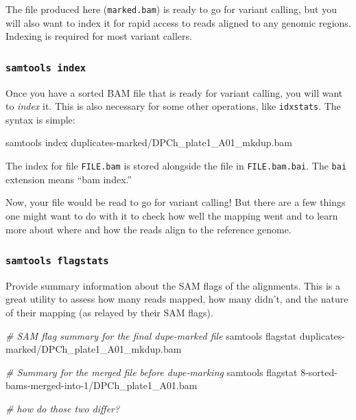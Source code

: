 \documentclass[]{krantz}
\makeatletter
\newenvironment{Shaded}{\begin{snugshade}}{\end{snugshade}}
\newcommand{\CommentTok}[1]{\textcolor[rgb]{0.37,0.37,0.37}{\textit{#1}}}
\newcommand{\ExtensionTok}[1]{#1}
\newcommand{\NormalTok}[1]{#1}
\newenvironment{kframe}{%
\medskip{}
\setlength{\fboxsep}{.8em}
 \def\at@end@of@kframe{}%
 \ifinner\ifhmode%
  \def\at@end@of@kframe{\end{minipage}}%
  \begin{minipage}{\columnwidth}%
 \fi\fi%
 \def\FrameCommand##1{\hskip\@totalleftmargin \hskip-\fboxsep
 \colorbox{shadecolor}{##1}\hskip-\fboxsep
     \hskip-\linewidth \hskip-\@totalleftmargin \hskip\columnwidth}%
 \MakeFramed {\advance\hsize-\width
   \@totalleftmargin\z@ \linewidth\hsize
   \@setminipage}}%
 {\par\unskip\endMakeFramed%
 \at@end@of@kframe}
\renewenvironment{Shaded}{\begin{kframe}}{\end{kframe}}
\makeatother
\begin{document}
The file produced here (\texttt{marked.bam}) is ready to go for variant calling, but
you will also want to index it for rapid access to reads aligned to any genomic
regions. Indexing is required for most variant callers.

\hypertarget{samtools-index}{%
\subsubsection{\texorpdfstring{\texttt{samtools\ index}}{samtools index}}\label{samtools-index}}

Once you have a sorted BAM file that is ready for variant calling, you will want
to \emph{index} it. This is also necessary for some other operations, like \texttt{idxstats}.
The syntax is simple:

\begin{Shaded}
\begin{Highlighting}[]
\ExtensionTok{samtools}\NormalTok{ index duplicates-marked/DPCh_plate1_A01_mkdup.bam}
\end{Highlighting}
\end{Shaded}

The index for file \texttt{FILE.bam} is stored alongside the file in
\texttt{FILE.bam.bai}. The \texttt{bai} extension means ``bam index.''

Now, your file would be read to go for variant calling!
But there are a few things one might want to do with it to check how well
the mapping went and to learn more about where and how the reads align
to the reference genome.

\hypertarget{samtools-flagstats}{%
\subsubsection{\texorpdfstring{\texttt{samtools\ flagstats}}{samtools flagstats}}\label{samtools-flagstats}}

Provide summary information about the SAM flags of the alignments.
This is a great utility to assess how many reads mapped, how many didn't,
and the nature of their mapping (as relayed by their SAM flags).

\begin{Shaded}
\begin{Highlighting}[]
\CommentTok{# SAM flag summary for the final dupe-marked file}
\ExtensionTok{samtools}\NormalTok{ flagstat duplicates-marked/DPCh_plate1_A01_mkdup.bam}

\CommentTok{# Summary for the merged file before dupe-marking}
\ExtensionTok{samtools}\NormalTok{ flagstat  8-sorted-bams-merged-into-1/DPCh_plate1_A01.bam}

\CommentTok{# how do those two differ?}
\end{Highlighting}
\end{Shaded}
\end{document}
